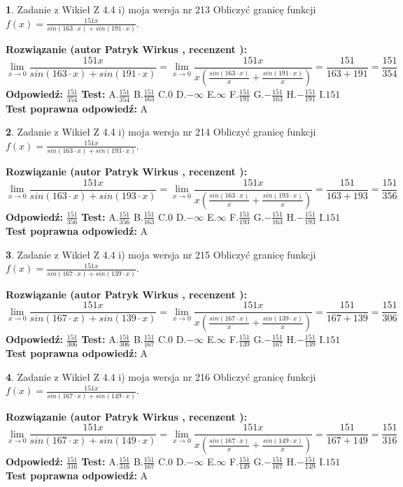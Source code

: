 \documentclass[12pt, a4paper]{article}
\theoremstyle{definition} %
\newtheorem{zad}{}
\newcommand{\zadStart}[1]{\begin{zad}#1\newline}
\newcommand{\zadStop}{\end{zad}}
\newcommand{\rozwStart}[2]{\noindent \textbf{Rozwiązanie (autor #1 , recenzent #2): }\newline}
\newcommand{\rozwStop}{\newline}
\newcommand{\odpStart}{\noindent \textbf{Odpowiedź:}\newline}
\newcommand{\odpStop}{\newline}
\newcommand{\testStart}{\noindent \textbf{Test:}\newline}
\newcommand{\testStop}{\newline}
\newcommand{\kluczStart}{\noindent \textbf{Test poprawna odpowiedź:}\newline}
\newcommand{\kluczStop}{\newline}
\begin{document}
\zadStart{Zadanie z Wikieł Z 4.4 i) moja wersja nr 213}
Obliczyć granicę funkcji $f(x)=\frac{151x}{sin(163\cdot x) +sin(191\cdot x)}$.
\zadStop
\rozwStart{Patryk Wirkus}{}
$$\lim\limits_{x\to 0}\frac{151x}{sin(163\cdot x) +sin(191\cdot x)}=\lim\limits_{x\to 0}\frac{151x}{x(\frac{sin(163\cdot x)}{x}+\frac{sin(191\cdot x)}{x})}=\frac{151}{163+191} = \frac{151}{354}$$
\rozwStop
\odpStart
$\frac{151}{354}$
\odpStop
\testStart
A.$\frac{151}{354}$
B.$\frac{151}{163}$
C.$0$
D.$-\infty$
E.$\infty$
F.$\frac{151}{191}$
G.$-\frac{151}{163}$
H.$-\frac{151}{191}$
I.$151$
\testStop
\kluczStart
A
\kluczStop



\zadStart{Zadanie z Wikieł Z 4.4 i) moja wersja nr 214}
Obliczyć granicę funkcji $f(x)=\frac{151x}{sin(163\cdot x) +sin(193\cdot x)}$.
\zadStop
\rozwStart{Patryk Wirkus}{}
$$\lim\limits_{x\to 0}\frac{151x}{sin(163\cdot x) +sin(193\cdot x)}=\lim\limits_{x\to 0}\frac{151x}{x(\frac{sin(163\cdot x)}{x}+\frac{sin(193\cdot x)}{x})}=\frac{151}{163+193} = \frac{151}{356}$$
\rozwStop
\odpStart
$\frac{151}{356}$
\odpStop
\testStart
A.$\frac{151}{356}$
B.$\frac{151}{163}$
C.$0$
D.$-\infty$
E.$\infty$
F.$\frac{151}{193}$
G.$-\frac{151}{163}$
H.$-\frac{151}{193}$
I.$151$
\testStop
\kluczStart
A
\kluczStop



\zadStart{Zadanie z Wikieł Z 4.4 i) moja wersja nr 215}
Obliczyć granicę funkcji $f(x)=\frac{151x}{sin(167\cdot x) +sin(139\cdot x)}$.
\zadStop
\rozwStart{Patryk Wirkus}{}
$$\lim\limits_{x\to 0}\frac{151x}{sin(167\cdot x) +sin(139\cdot x)}=\lim\limits_{x\to 0}\frac{151x}{x(\frac{sin(167\cdot x)}{x}+\frac{sin(139\cdot x)}{x})}=\frac{151}{167+139} = \frac{151}{306}$$
\rozwStop
\odpStart
$\frac{151}{306}$
\odpStop
\testStart
A.$\frac{151}{306}$
B.$\frac{151}{167}$
C.$0$
D.$-\infty$
E.$\infty$
F.$\frac{151}{139}$
G.$-\frac{151}{167}$
H.$-\frac{151}{139}$
I.$151$
\testStop
\kluczStart
A
\kluczStop



\zadStart{Zadanie z Wikieł Z 4.4 i) moja wersja nr 216}
Obliczyć granicę funkcji $f(x)=\frac{151x}{sin(167\cdot x) +sin(149\cdot x)}$.
\zadStop
\rozwStart{Patryk Wirkus}{}
$$\lim\limits_{x\to 0}\frac{151x}{sin(167\cdot x) +sin(149\cdot x)}=\lim\limits_{x\to 0}\frac{151x}{x(\frac{sin(167\cdot x)}{x}+\frac{sin(149\cdot x)}{x})}=\frac{151}{167+149} = \frac{151}{316}$$
\rozwStop
\odpStart
$\frac{151}{316}$
\odpStop
\testStart
A.$\frac{151}{316}$
B.$\frac{151}{167}$
C.$0$
D.$-\infty$
E.$\infty$
F.$\frac{151}{149}$
G.$-\frac{151}{167}$
H.$-\frac{151}{149}$
I.$151$
\testStop
\kluczStart
A
\kluczStop
\end{document}
